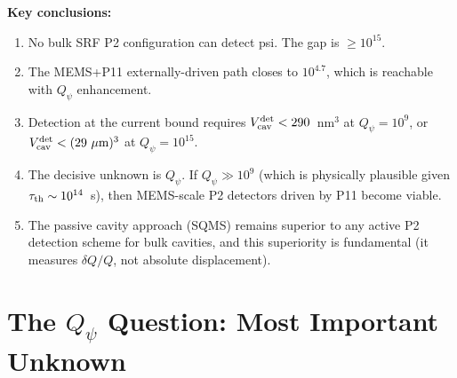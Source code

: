 \documentclass[11pt,twocolumn]{article}
\newcommand{\Qpsi}{Q_\psi}
\newcommand{\Vcav}{V_{\rm cav}}
\theoremstyle{definition}
\theoremstyle{remark}
\begin{document}
\begin{tcolorbox}[colback=blue!5!white, colframe=blue!50!black,
  title=\textbf{Summary: P2 Detection Capabilities vs.\ Current Bound}]
\textbf{Key conclusions:}
\begin{enumerate}[nosep]
\item No bulk SRF P2 configuration can detect psi. The gap is
  $\geq 10^{15}$.
\item The MEMS+P11 externally-driven path closes to $10^{4.7}$,
  which is reachable with $\Qpsi$ enhancement.
\item Detection at the current bound requires
  $\Vcav^{\rm det} < 290$~nm$^3$ at $\Qpsi = 10^9$, or
  $\Vcav^{\rm det} < (29~\mu\text{m})^3$ at $\Qpsi = 10^{15}$.
\item The decisive unknown is $\Qpsi$. If $\Qpsi \gg 10^9$
  (which is physically plausible given $\tau_{\rm th} \sim 10^{14}$~s),
  then MEMS-scale P2 detectors driven by P11 become viable.
\item The passive cavity approach (SQMS) remains superior to any
  active P2 detection scheme for bulk cavities, and this superiority
  is fundamental (it measures $\delta Q/Q$, not absolute displacement).
\end{enumerate}
\end{tcolorbox}

\section{The $\Qpsi$ Question: Most Important Unknown}
\label{sec:Qpsi}
\end{document}
